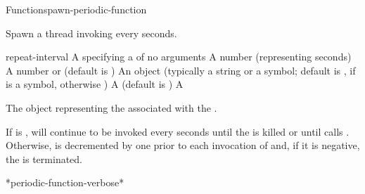 \documentclass[10pt,twoside,english,pdftex]{article}
\begin{document}
\begin{functiondoc}{Function}{spawn-periodic-function}%
  {
    }
%
%

\fnsyntax

\fnpurpose Spawn a thread invoking  every
 seconds.

\fnpackage {}

\fnmodule {}

\fnargs
\begin{args}{repeat-interval}
\arg[function] A  specifying a
   of no arguments
 A number (representing seconds)
\arg[count] A number or \nil{} (default is \nil)
\arg[name] An object (typically a string or a symbol; default is
, if  is a symbol, otherwise \nil)
\arg[verbose] A 
  (default is )
\arg[thread] A 
\end{args}

\fnreturns The object representing the  associated with the
.

\fnerrors
\nothreads{}

\fndescription If  is \nil,  will continue
to be invoked every  seconds until the
  is killed or until
 calls
.  Otherwise,
 is decremented by one prior to each invocation of
 and, if it is negative, the 
is terminated.

\begin{alsos}{*periodic-function-verbose*}
\end{alsos}


\end{functiondoc}
\end{document}
